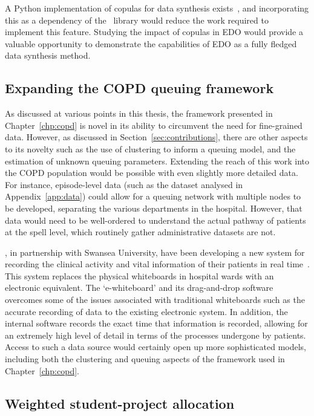 A Python implementation of copulas for data synthesis exists~\cite{copulas}, and
incorporating this as a dependency of the \edo\ library would reduce the work
required to implement this feature. Studying the impact of copulas in EDO would
provide a valuable opportunity to demonstrate the capabilities of EDO as a fully
fledged data synthesis method.

\subsection*{Expanding the COPD queuing framework}

As discussed at various points in this thesis, the framework presented in
Chapter~\ref{chp:copd} is novel in its ability to circumvent the need for
fine-grained data. However, as discussed in Section~\ref{sec:contributions},
there are other aspects to its novelty such as the use of clustering to inform a
queuing model, and the estimation of unknown queuing parameters. Extending the
reach of this work into the COPD population would be possible with even slightly
more detailed data. For instance, episode-level data (such as the dataset
analysed in Appendix~\ref{app:data}) could allow for a queuing network with
multiple nodes to be developed, separating the various departments in the
hospital. However, that data would need to be well-ordered to understand the
actual pathway of patients at the spell level, which routinely gather
administrative datasets are not.

\ctmuhb, in partnership with Swansea University, have been developing a new
system for recording the clinical activity and vital information of their
patients in real time~\cite{whiteboards}. This system replaces the physical
whiteboards in hospital wards with an electronic equivalent. The `e-whiteboard'
and its drag-and-drop software overcomes some of the issues associated with
traditional whiteboards such as the accurate recording of data to the existing
electronic system. In addition, the internal software records the exact time
that information is recorded, allowing for an extremely high level of detail in
terms of the processes undergone by patients. Access to such a data source would
certainly open up more sophisticated models, including both the clustering and
queuing aspects of the framework used in Chapter~\ref{chp:copd}.

\subsection*{Weighted student-project allocation}

